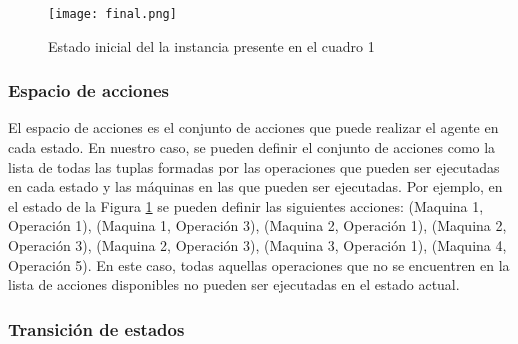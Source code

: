 \begin{figure}[ht]
    \centering
    \texttt{[image: final.png]}
    \caption{Estado inicial del la instancia presente en el cuadro 1}
    \label{fig:final-solution}
\end{figure}



\subsubsection{Espacio de acciones}
El espacio de acciones es el conjunto de acciones que puede realizar el agente en cada estado. 
En nuestro caso, se pueden definir el conjunto de acciones como la lista de todas las tuplas 
formadas por las operaciones que pueden ser ejecutadas en cada estado y las máquinas en las que
pueden ser ejecutadas. Por ejemplo, en el estado de la Figura \ref{fig:final-solution} se pueden
definir las siguientes acciones: (Maquina 1, Operación 1), (Maquina 1, Operación 3), 
(Maquina 2, Operación 1), (Maquina 2, Operación 3), (Maquina 2, Operación 3), (Maquina 3, Operación 1), 
(Maquina 4, Operación 5). En este caso, todas aquellas operaciones que no se encuentren en la lista 
de acciones disponibles no pueden ser ejecutadas en el estado actual.

\subsubsection{Transición de estados}

\pagebreak
